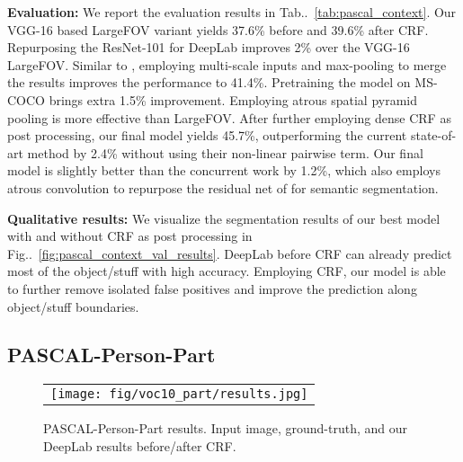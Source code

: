 \documentclass[10pt,journal,compsoc]{IEEEtran}
\makeatletter
\newcommand{\figref}[1]{Fig\onedot~\ref{#1}}
\newcommand{\tabref}[1]{Tab\onedot~\ref{#1}}
\def\onedot{\ifx\@let@token.\else.\null\fi\xspace}
\makeatother
\begin{document}
\textbf{Evaluation:} We report the evaluation results in \tabref{tab:pascal_context}.
Our VGG-16 based LargeFOV variant yields 37.6\% before and 39.6\% after CRF.
Repurposing the ResNet-101 \cite{he2015deep} for DeepLab improves 2\% over the
VGG-16 LargeFOV. Similar to \cite{chen2015attention}, employing multi-scale inputs
and max-pooling to merge the results improves the performance to 41.4\%.
Pretraining the model on MS-COCO brings extra 1.5\% improvement.
Employing atrous spatial pyramid pooling is more effective than LargeFOV.
After further employing dense CRF as post processing, our final model
yields 45.7\%, outperforming the current state-of-art method
\cite{lin2015efficient} by 2.4\% without using their non-linear pairwise term. Our final
model is slightly better than the concurrent work \cite{wu2016bridging} by 1.2\%, which also employs
atrous convolution to repurpose the residual net of \cite{he2015deep} for semantic segmentation.

\textbf{Qualitative results:} We visualize the segmentation results of our best
model with and without CRF as post processing in
\figref{fig:pascal_context_val_results}. DeepLab before CRF can already predict
most of the object/stuff with high accuracy. Employing CRF, our model is able to
further remove isolated false positives and improve the prediction along
object/stuff boundaries.

\subsection{PASCAL-Person-Part}
\label{exp:pascal_person_part}

\begin{figure*}[!th]
  \centering
\scalebox{0.9} {
  \begin{tabular}{c}
    \texttt{[image: fig/voc10\_part/results.jpg]} \\
  \end{tabular}
  }
  \caption{PASCAL-Person-Part results. Input image, ground-truth,
    and our DeepLab results before/after CRF.}
  \label{fig:voc10_part_val_results}
\end{figure*}
\end{document}
